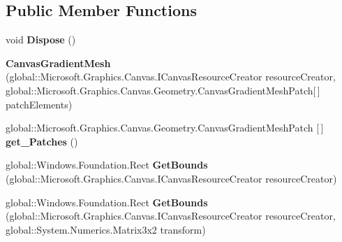 \subsection*{Public Member Functions}
\begin{DoxyCompactItemize}
\item 
\mbox{\label{class_microsoft_1_1_graphics_1_1_canvas_1_1_geometry_1_1_canvas_gradient_mesh_aff29d3a0c6889d589409c3bd3402cb7c}} 
void {\bfseries Dispose} ()
\item 
\mbox{\label{class_microsoft_1_1_graphics_1_1_canvas_1_1_geometry_1_1_canvas_gradient_mesh_a6677d365775f86d865af80a34d58b31d}} 
{\bfseries Canvas\+Gradient\+Mesh} (global\+::\+Microsoft.\+Graphics.\+Canvas.\+I\+Canvas\+Resource\+Creator resource\+Creator, global\+::\+Microsoft.\+Graphics.\+Canvas.\+Geometry.\+Canvas\+Gradient\+Mesh\+Patch\mbox{[}$\,$\mbox{]} patch\+Elements)
\item 
\mbox{\label{class_microsoft_1_1_graphics_1_1_canvas_1_1_geometry_1_1_canvas_gradient_mesh_ad14c223648421f65d2cbd4de1c1b0877}} 
global\+::\+Microsoft.\+Graphics.\+Canvas.\+Geometry.\+Canvas\+Gradient\+Mesh\+Patch \mbox{[}$\,$\mbox{]} {\bfseries get\+\_\+\+Patches} ()
\item 
\mbox{\label{class_microsoft_1_1_graphics_1_1_canvas_1_1_geometry_1_1_canvas_gradient_mesh_a3239426176127d3d80193f667dcd34f8}} 
global\+::\+Windows.\+Foundation.\+Rect {\bfseries Get\+Bounds} (global\+::\+Microsoft.\+Graphics.\+Canvas.\+I\+Canvas\+Resource\+Creator resource\+Creator)
\item 
\mbox{\label{class_microsoft_1_1_graphics_1_1_canvas_1_1_geometry_1_1_canvas_gradient_mesh_a446144d0cc83e13b8dab0cb1b480a549}} 
global\+::\+Windows.\+Foundation.\+Rect {\bfseries Get\+Bounds} (global\+::\+Microsoft.\+Graphics.\+Canvas.\+I\+Canvas\+Resource\+Creator resource\+Creator, global\+::\+System.\+Numerics.\+Matrix3x2 transform)
\item 
\mbox{\label{class_microsoft_1_1_graphics_1_1_canvas_1_1_geometry_1_1_canvas_gradient_mesh_aa06489c123c9a773e0a00e8dacd96bfd}} 

\end{DoxyCompactItemize}
